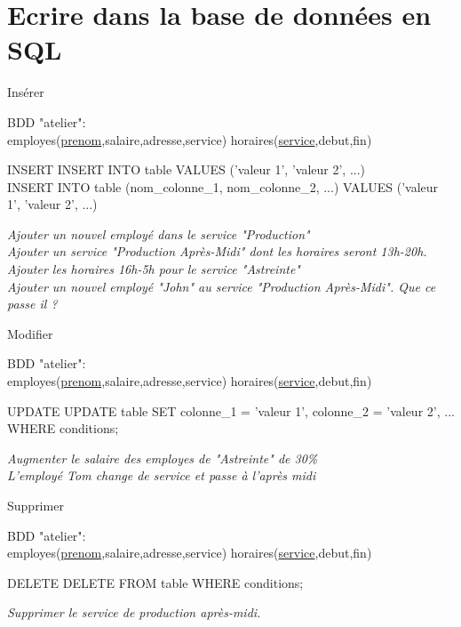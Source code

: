 \documentclass[xetex,dvipsnames]{beamer}
\begin{document}
\section{Ecrire dans la base de données en SQL}
\begin{frame}[t]{Insérer}
\begin{small}
		BDD "atelier": \\employes(\underline{prenom},salaire,adresse,service) horaires(\underline{service},debut,fin)
\end{small}	
	\begin{alertblock}{INSERT}
	INSERT INTO table VALUES ('valeur 1', 'valeur 2', ...)\\
	INSERT INTO table (nom\_colonne\_1, nom\_colonne\_2, ...) VALUES ('valeur 1', 'valeur 2', ...)
	\end{alertblock}
		
	\textit{Ajouter un nouvel employé dans le service "Production"}\\
	\textit{Ajouter un service "Production Après-Midi" dont les horaires seront 13h-20h.}\\
	\textit{Ajouter les horaires 16h-5h pour le service "Astreinte"}\\
	\textit{Ajouter un nouvel employé "John" au service "Production Après-Midi". Que ce passe il ? }\\
\end{frame}

\begin{frame}[t]{Modifier}
	\begin{small}
		BDD "atelier": \\employes(\underline{prenom},salaire,adresse,service) horaires(\underline{service},debut,fin)
	\end{small}	
	\begin{alertblock}{UPDATE}
		UPDATE table SET colonne\_1 = 'valeur 1', colonne\_2 = 'valeur 2', ... WHERE conditions;
	\end{alertblock}
	\textit{Augmenter le salaire des employes de "Astreinte" de 30\%}\\
	\textit{L'employé Tom change de service et passe à l'après midi }\\
\end{frame}

\begin{frame}[t]{Supprimer}
	\begin{small}
		BDD "atelier": \\employes(\underline{prenom},salaire,adresse,service) horaires(\underline{service},debut,fin)
	\end{small}	
	\begin{alertblock}{DELETE}
		DELETE FROM table WHERE conditions;
	\end{alertblock}
	\textit{Supprimer le service de production après-midi.}\\
\end{frame}
\end{document}

